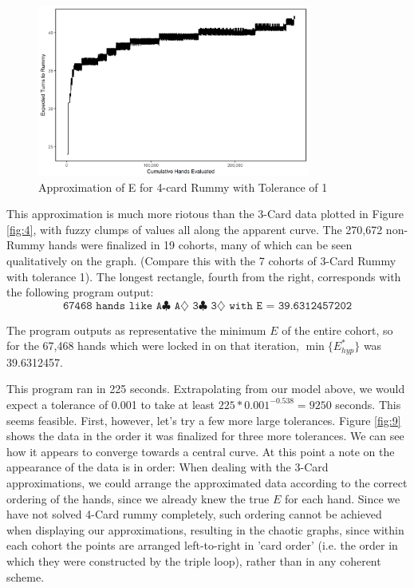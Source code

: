 \documentclass[letter,12pt]{article}
\begin{document}
\begin{figure}
\centering
\includegraphics[width=0.8\textwidth]{fig8.png}
\caption{Approximation of E for 4-card Rummy with Tolerance of 1}\label{fig:8}
\end{figure}


This approximation is much more riotous than the 3-Card data plotted in Figure \ref{fig:4}, with fuzzy clumps of values all along the apparent curve. The 270,672 non-Rummy hands were finalized in 19 cohorts, many of which can be seen qualitatively on the graph. (Compare this with the 7 cohorts of 3-Card Rummy with tolerance 1). The longest rectangle, fourth from the right, corresponds with the following program output:
$$\texttt{67468 hands like A$\clubsuit$ A$\diamondsuit$ 3$\clubsuit$ 3$\diamondsuit$ with E = 39.6312457202}$$

The program outputs as representative the minimum $E$ of the entire cohort, so for the 67,468 hands which were locked in on that iteration, $\min\{E_{hyp}^*\}$ was 39.6312457. 

This program ran in 225 seconds. Extrapolating from our model above, we would expect a tolerance of 0.001 to take at least $225 * 0.001^{-0.538} = 9250$ seconds. This seems feasible. First, however, let's try a few more large tolerances. Figure \ref{fig:9} shows the data in the order it was finalized for three more tolerances. We can see how it appears to converge towards a central curve. At this point a note on the appearance of the data is in order: When dealing with the 3-Card approximations, we could arrange the approximated data according to the correct ordering of the hands, since we already knew the true $E$ for each hand. Since we have not solved 4-Card rummy completely, such ordering cannot be achieved when displaying our approximations, resulting in the chaotic graphs, since within each cohort the points are arranged left-to-right in 'card order' (i.e. the order in which they were constructed by the triple loop), rather than in any coherent scheme.
\end{document}
